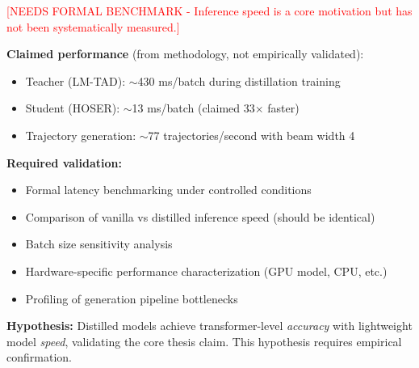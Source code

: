 \textcolor{red}{[NEEDS FORMAL BENCHMARK - Inference speed is a core motivation but has not been systematically measured.]}

\textbf{Claimed performance} (from methodology, not empirically validated):
\begin{itemize}[noitemsep,topsep=0pt]
\item Teacher (LM-TAD): $\sim$430 ms/batch during distillation training
\item Student (HOSER): $\sim$13 ms/batch (claimed 33$\times$ faster)
\item Trajectory generation: $\sim$77 trajectories/second with beam width 4
\end{itemize}

\textbf{Required validation:}
\begin{itemize}[noitemsep,topsep=0pt]
\item Formal latency benchmarking under controlled conditions
\item Comparison of vanilla vs distilled inference speed (should be identical)
\item Batch size sensitivity analysis
\item Hardware-specific performance characterization (GPU model, CPU, etc.)
\item Profiling of generation pipeline bottlenecks
\end{itemize}

\textbf{Hypothesis:} Distilled models achieve transformer-level \emph{accuracy} with lightweight model \emph{speed}, validating the core thesis claim. This hypothesis requires empirical confirmation.


